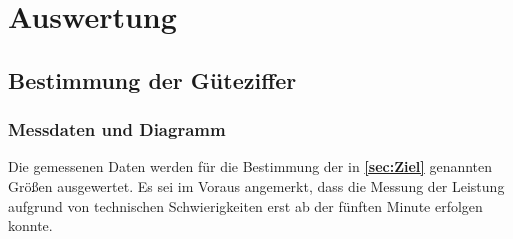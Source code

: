 \newpage
\section{Auswertung}
\label{sec:Auswertung}

\subsection{Bestimmung der Güteziffer}

\subsubsection{Messdaten und Diagramm}

Die gemessenen Daten werden für die Bestimmung der in \textbf{\ref{sec:Ziel}} genannten Größen ausgewertet.
Es sei im Voraus angemerkt, dass die Messung der Leistung aufgrund von technischen Schwierigkeiten erst ab der fünften Minute erfolgen konnte.

